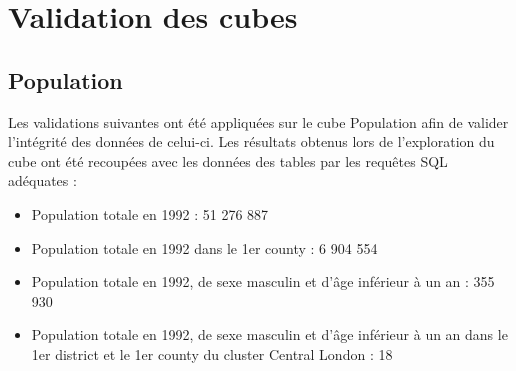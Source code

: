 \pagebreak


\chapter{Validation des cubes}
\section{Population}
Les validations suivantes ont été appliquées sur le cube Population afin de valider l'intégrité des données de celui-ci. Les résultats obtenus lors de l'exploration du cube ont été recoupées avec les données des tables par les requêtes SQL adéquates :
\begin{itemize}
    \item Population totale en 1992 : 51 276 887
    \item Population totale en 1992 dans le 1er county : 6 904 554
    \item Population totale en 1992, de sexe masculin et d'âge inférieur à un an : 355 930
    \item Population totale en 1992, de sexe masculin et d'âge inférieur à un an dans le 1er district et le 1er county du cluster Central London : 18
\end{itemize}


\pagebreak
